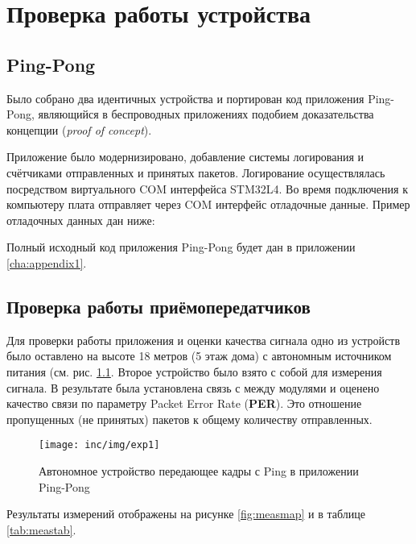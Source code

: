 \chapter{Проверка работы устройства}
\label{cha:pract}

\section{Ping-Pong}

Было собрано два идентичных устройства и портирован код приложения Ping-Pong, 
являющийся в беспроводных приложениях подобием доказательства концепции 
(\textit{proof of concept}).

Приложение было модернизировано, добавление системы логирования и счётчиками 
отправленных и принятых пакетов.
Логирование осуществлялась посредством виртуального COM интерфейса STM32L4.
Во время подключения к компьютеру плата отправляет через COM интерфейс 
отладочные данные. 
Пример отладочных данных дан ниже:

Полный исходный код приложения Ping-Pong будет дан в приложении 
\ref{cha:appendix1}.

\section{Проверка работы приёмопередатчиков}

Для проверки работы приложения и оценки качества сигнала одно из устройств было 
оставлено на высоте 18 метров (5 этаж дома) с автономным источником питания 
(см. рис. \ref{fig:exp1}.
Второе устройство было взято с собой для измерения сигнала. 
В результате была установлена связь с между модулями и оценено качество связи 
по параметру Packet Error Rate (\textbf{PER}). 
Это отношение пропущенных (не принятых) пакетов к общему количеству 
отправленных.

\begin{figure}[!h]
  \centering
  \texttt{[image: inc/img/exp1]}
  \caption{Автономное устройство передающее кадры с Ping в приложении Ping-Pong}
  \label{fig:exp1}
\end{figure}

Результаты измерений отображены на рисунке \ref{fig:measmap} и в таблице 
\ref{tab:meastab}.

